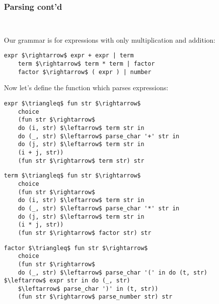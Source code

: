 \documentclass[t]{beamer}
\begin{document}
\begin{frame}[fragile]
	\frametitle{Parsing cont'd}
\begin{lstlisting}[language=pratner, mathescape=true, basicstyle=\scriptsize, aboveskip=0pt, belowskip=0pt, columns=fullflexible]
	
\end{lstlisting}

Our grammar is for expressions with only multiplication and addition:

\begin{lstlisting}[mathescape = true, basicstyle=\scriptsize]
	expr $\rightarrow$ expr + expr | term
	term $\rightarrow$ term * term | factor
	factor $\rightarrow$ ( expr ) | number
\end{lstlisting}
Now let's define the function which parses expressions:

\begin{multicols}{2} 
	
	\begin{lstlisting}[language=pratner, mathescape=true, basicstyle=\scriptsize, aboveskip=0pt, belowskip=0pt, columns=fullflexible]
expr $\triangleq$ fun str $\rightarrow$
	choice
	(fun str $\rightarrow$ 
	do (i, str) $\leftarrow$ term str in
	do (_, str) $\leftarrow$ parse_char '+' str in
	do (j, str) $\leftarrow$ term str in
	(i + j, str))
	(fun str $\rightarrow$ term str) str
	\end{lstlisting}
	
	\columnbreak
	
	\begin{lstlisting}[language=pratner, mathescape=true, basicstyle=\scriptsize, aboveskip=0pt, belowskip=0pt, columns=fullflexible]
term $\triangleq$ fun str $\rightarrow$
	choice 
	(fun str $\rightarrow$ 
	do (i, str) $\leftarrow$ term str in
	do (_, str) $\leftarrow$ parse_char '*' str in
	do (j, str) $\leftarrow$ term str in
	(i * j, str))
	(fun str $\rightarrow$ factor str) str
	\end{lstlisting}
\end{multicols}
	
	\begin{lstlisting}[language=pratner, mathescape=true, basicstyle=\scriptsize, aboveskip=-5pt, belowskip=0pt, columns=fullflexible]
factor $\triangleq$ fun str $\rightarrow$
	choice 
	(fun str $\rightarrow$
	do (_, str) $\leftarrow$ parse_char '(' in do (t, str) $\leftarrow$ expr str in do (_, str) 
	$\leftarrow$ parse_char ')' in (t, str))
	(fun str $\rightarrow$ parse_number str) str
	\end{lstlisting}
	

\end{frame}
\end{document}
